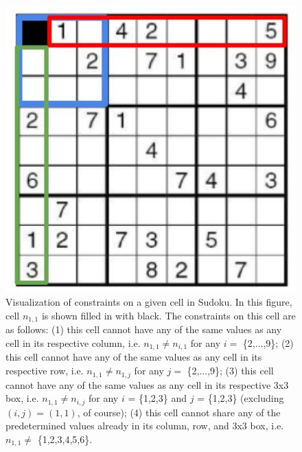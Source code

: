 \documentclass[12pt]{article}
\begin{document}
\begin{enumerate}[label=(\alph*)]
        \begin{figure}[h]
            \centering
            \includegraphics[scale=0.5]{homework1/images/drawndiagrams/prob4a.jpg}
	      \caption{Visualization of constraints on a given cell in Sudoku. In this figure, cell $n_{1,1}$ is shown filled in with black. The constraints on this cell are as follows: (1) this cell cannot have any of the same values as any cell in its respective column, i.e. $n_{1,1} \neq n_{i, 1}$ for any $i =$ \{2,...,9\}; (2) this cell cannot have any of the same values as any cell in its respective row, i.e. $n_{1,1} \neq n_{1,j}$ for any $j =$ \{2,...,9\}; (3) this cell cannot have any of the same values as any cell in its respective 3x3 box, i.e. $n_{1,1} \neq n_{i,j}$ for any $i$ = \{1,2,3\} and $j$ = \{1,2,3\} (excluding $(i,j) = (1,1)$, of course); (4) this cell cannot share any of the predetermined values already in its column, row, and 3x3 box, i.e. $n_{1,1} \neq$ \{1,2,3,4,5,6\}.}
	      \label{fig:prob4a}
        \end{figure}
        

\end{enumerate}
\end{document}
